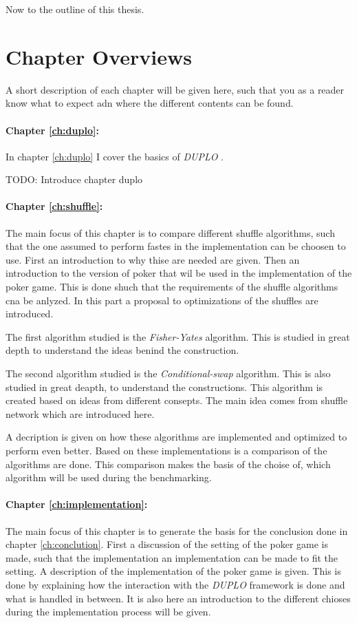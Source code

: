 \documentclass[twoside,11pt,openright]{report}
\newcommand{\todo}[1]{}
\renewcommand{\todo}[1]{{\color{red} TODO: {#1}} \\}
\newcommand{\FY}{\textit{Fisher-Yates} }
\newcommand{\CS}{\textit{Conditional-swap} }
\newcommand{\DUPLO}{\textit{DUPLO} }
\begin{document}
Now to the outline of this thesis.



\section{Chapter Overviews}

A short description of each chapter will be given here, such that you as a reader know what to expect adn where the different contents can be found. 

\paragraph{Chapter \ref{ch:duplo}:}
In chapter \ref{ch:duplo} I cover the basics of \DUPLO. 

\todo{Introduce chapter duplo}

\paragraph{Chapter \ref{ch:shuffle}:}
The main focus of this chapter is to compare different shuffle algorithms, such that the one assumed to perform fastes in the implementation can be choosen to use. First an introduction to why thise are needed are given. Then an introduction to the version of poker that wil be used in the implementation of the poker game. This is done shuch that the requirements of the shuffle algorithms cna be anlyzed. In this part a proposal to optimizations of the shuffles are introduced. 

The first algorithm studied is the \FY algorithm. This is studied in great depth to understand the ideas benind the construction.

The second algorithm studied is the \CS algorithm. This is also studied in great deapth, to understand the constructions. This algorithm is created based on ideas from different consepts. The main idea comes from shuffle network which are introduced here. 

A decription is given on how these algorithms are implemented and optimized to perform even better. Based on these implementations is a comparison of the algorithms are done. This comparison makes the basis of the choise of, which algorithm will be used during the benchmarking.


\paragraph{Chapter \ref{ch:implementation}:}
The main focus of this chapter is to generate the basis for the conclusion done in chapter \ref{ch:conclution}. First a discussion of the setting of the poker game is made, such that the implementation an implementation can be made to fit the setting. A description of the implementation of the poker game is given. This is done by explaining how the interaction with the \DUPLO framework is done and what is handled in between. It is also here an introduction to the different chioses during the implementation process will be given.
\end{document}
